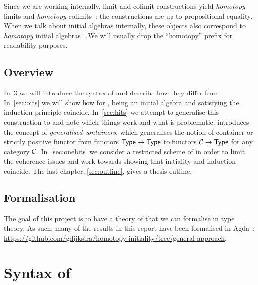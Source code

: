 \documentclass[a4paper,10pt]{report}
\begin{document}
Since we are working internally, limit and colimit constructions yield
\emph{homotopy} limits and \emph{homotopy} colimits~\cite{Avigad2015}:
the constructions are up to propositional equality. When we talk about
initial algebras internally, these objects also correspond to
\emph{homotopy} initial algebras~\cite{Awodey2012}. We will usually
drop the ``homotopy'' prefix for readability purposes.

\section{Overview}
\label{sec:overview}

In~\cref{sec:syntax} we will introduce the syntax of \hits and
describe how they differ from \oits. In~\cref{sec:oits} we will show
how for \oits, being an initial algebra and satisfying the induction
principle coincide. In~\cref{sec:hits} we attempt to generalise this
construction to \hits and note which things work and what is
problematic.  introduces the concept of
\emph{generalised containers}, which generalises the notion of
container or strictly positive functor from functors $\mathsf{Type} \to \mathsf{Type}$
to functors $\mathcal{C} \to \mathsf{Type}$ for any category
$\mathcal{C}$. In~\cref{sec:onehits} we consider a restricted scheme of \hits
in order to limit the coherence issues and work towards showing that
initiality and induction coincide. The last chapter,
\cref{sec:outline}, gives a thesis outline.

\section{Formalisation}
\label{sec:formalisation}

The goal of this project is to have a theory of \hits that we can
formalise in type theory. As such, many of the results in this report
have been formalised in Agda~\cite{Norell2009}:
\url{https://github.com/gdijkstra/homotopy-initiality/tree/general-approach}.

\chapter{Syntax of \hits}
\label{sec:syntax}
\end{document}
